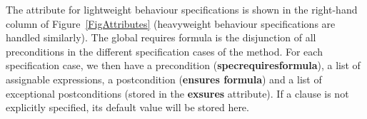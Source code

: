 The attribute for lightweight behaviour specifications is shown in the
right-hand column of Figure~\ref{FigAttributes} (heavyweight behaviour
specifications are handled similarly).  The global requires formula is
the disjunction of all preconditions in the different specification
cases of the method. For each specification case, we then have a
precondition (\textbf{spec\unsc requires\unsc formula}), a list of
assignable expressions, a postcondition (\textbf{ensures\unsc
formula}) and a list of exceptional postconditions (stored in the
\textbf{exsures} attribute). If a clause is not explicitly specified,
its default value will be stored here. 




